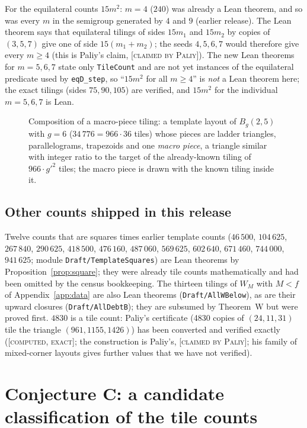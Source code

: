 \documentclass[11pt,reqno]{amsart}
\theoremstyle{plain}
\theoremstyle{definition}
\newcommand{\lab}[1]{\textup{[\textsc{#1}]}}
\newcommand{\CE}{\lab{computed, exact}}
\newcommand{\CP}{\lab{claimed by Paliy}}
\newcommand{\FIGSLOT}[1]{\begin{center}\fbox{\parbox{0.88\linewidth}{\centering\vspace{3.5em}\textsf{[figure slot: #1]}\vspace{3.5em}}}\end{center}}
\begin{document}
For the equilateral counts $15m^2$: $m=4$ ($240$) was already a Lean theorem, and so was every $m$ in the semigroup generated by $4$ and $9$ (earlier release).
The Lean theorem  says that equilateral tilings of sides $15m_1$ and $15m_2$ by copies of $(3,5,7)$ give one of side $15(m_1+m_2)$; the seeds $4,5,6,7$ would therefore give every $m\ge4$ (this is Paliy's claim, \CP{}).
The new Lean theorems for $m=5,6,7$ state only \texttt{TileCount} and are not yet instances of the equilateral predicate used by \texttt{eqD\_step}, so ``$15m^2$ for all $m\ge4$'' is \emph{not} a Lean theorem here; the exact tilings (sides $75,90,105$) are verified, and $15m^2$ for the individual $m=5,6,7$ is Lean.

\begin{figure}[ht]
\FIGSLOT{macro}
\caption{Composition of a macro-piece tiling: a template layout of $B_g(2,5)$ with $g=6$ ($34\,776=966\cdot36$ tiles) whose pieces are ladder triangles, parallelograms, trapezoids and one \emph{macro piece}, a triangle similar with integer ratio to the target of the already-known tiling of $966\cdot g'^2$ tiles; the macro piece is drawn with the known tiling inside it.}
\end{figure}

\subsection{Other counts shipped in this release}
Twelve counts that are squares times earlier template counts ($46\,500$, $104\,625$, $267\,840$, $290\,625$, $418\,500$, $476\,160$, $487\,060$, $569\,625$, $602\,640$, $671\,460$, $744\,000$, $941\,625$; module \texttt{Draft/TemplateSquares}) are Lean theorems by Proposition~\ref{prop:square}; they were already tile counts mathematically and had been omitted by the census bookkeeping.
The thirteen tilings of $W_M$ with $M<f$ of Appendix~\ref{app:data} are also Lean theorems (\texttt{Draft/AllWBelow}), as are their upward closures (\texttt{Draft/AllDebtB}); they are subsumed by Theorem~W but were proved first.
$4830$ is a tile count: Paliy's certificate (4830 copies of $(24,11,31)$ tile the triangle $(961,1155,1426)$) has been converted and verified exactly (\CE{}; the construction is Paliy's, \CP{}; his family of mixed-corner layouts gives further values that we have not verified).


\section{Conjecture C: a candidate classification of the tile counts}\label{sec:conjC}
\end{document}
